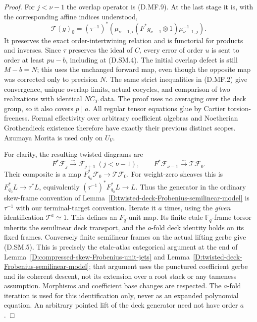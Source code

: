 \begin{proof}
For $j<\nu-1$ the overlap operator is (D.MF.9).
At the last stage it is, with the corresponding affine
indices understood,
\[
 \mathcal T(g)_0=(\tau^{-1})^*
 \left(\mu_{\nu-1,i}
       (F^*g_{\nu-1}\otimes1)\mu_{\nu-1,j}^{-1}\right).
                                                        \tag{D.SM.4}
\]
It preserves the exact order-intertwining relation and
is functorial for products and inverses. Since $\tau$
preserves the ideal of $C$, every error of order $u$ is
sent to order at least $pu-b$, including at (D.SM.4).
The initial overlap defect is still $M-b=N$; this
uses the unchanged forward map, even though the opposite
map was corrected only to precision $N$.
The same strict inequalities in (D.MF.2) give convergence,
unique overlap limits, actual cocycles, and comparison
of two realizations with identical $NC_T$ data. The
proof uses no averaging over the deck group, so it
also covers $p\mid a$.
All regular tensor equations glue by Cartier
torsion-freeness. Formal effectivity over arbitrary
coefficient algebras and Noetherian Grothendieck existence
therefore have exactly their previous distinct scopes.
Azumaya Morita is used only on $U_V$.

For clarity, the resulting twisted diagrams are
\[
 F^*\mathcal F_j\xrightarrow{\sim}\mathcal F_{j+1}
       \ (j<\nu-1),\qquad
 F^*\mathcal F_{\nu-1}\xrightarrow{\sim}
                                      \mathscr T\mathcal F_0 .
                                                        \tag{D.SM.5}
\]
Their composite is a map
$F_{q_0}^*\mathcal F_0\to\mathscr T\mathcal F_0$.
For weight-zero sheaves this is
$F_{q_0}^*L\to\tau^*L$, equivalently
$(\tau^{-1})^*F_{q_0}^*L\to L$. Thus the generator in
the ordinary skew-frame convention of
Lemma~\ref{D:twisted-deck-Frobenius-semilinear-model}
is $\tau^{-1}$ with our terminal-target convention.
Iterate it $a$ times, using the \emph{given} identification
$\mathscr T^a\simeq1$. This defines an $F_q$-unit map.
Its finite etale $\mathbb F_q$-frame torsor inherits the
semilinear deck transport, and the $a$-fold deck identity
holds on its fixed frames. Conversely finite semilinear
frames on the actual lifting gerbe give (D.SM.5).
This is precisely the etale-atlas categorical argument
at the end of Lemma~\ref{D:compressed-skew-Frobenius-unit-jets}
and Lemma~\ref{D:twisted-deck-Frobenius-semilinear-model};
that argument uses the punctured coefficient gerbe and
its coherent descent, not its extension over a root
stack or any tameness assumption. Morphisms and
coefficient base changes are respected.
The $a$-fold iteration is used for this identification
only, never as an expanded polynomial equation.
An arbitrary pointed lift of the deck generator need
not have order $a$.


\end{proof}
